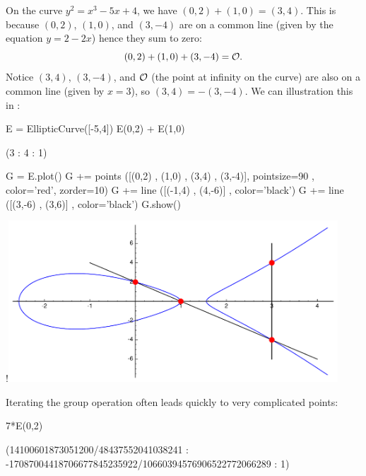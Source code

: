 \begin{example}\label{ex:ecgplaw}
On the curve $y^2=x^3-5x+4$, we have $(0,2) + (1,0) = (3,4)$.
This is because $(0,2)$, $(1,0)$, and $(3,-4)$ are on a common line
(given by the equation $y = 2 - 2x$) hence they sum to zero:
$$
  (0,2) + (1,0) + (3,-4) = \mathcal{O}.
$$
Notice $(3,4)$, $(3,-4)$, and $\mathcal{O}$ (the point at infinity on the curve) are also
on a common line (given by $x = 3$), so $(3,4)=-(3,-4)$.
We can illustration this in \sage:
\begin{sagecode}
\begin{sagecell}
E = EllipticCurve([-5,4])
E(0,2) + E(1,0)
\end{sagecell}
\begin{sageout}
(3 : 4 : 1)
\end{sageout}
\begin{sagecell} %

G = E.plot()
G += points ([(0,2) , (1,0) , (3,4) , (3,-4)],
    pointsize=90 , color='red', zorder=10)
G += line ([(-1,4) , (4,-6)] , color='black')
G += line ([(3,-6) , (3,6)] , color='black')
G.show()
\end{sagecell}
\begin{sageout}[escapechar=!] %
!\includegraphics[width=0.925\textwidth]{graphics/grouplaw}
\end{sageout}
\end{sagecode} %

\noindent
Iterating the group operation often leads quickly to
very complicated points:

\begin{sagecode} %
\begin{sagecell}
7*E(0,2)
\end{sagecell}
\begin{sageout}
(14100601873051200/48437552041038241 :
-17087004418706677845235922/10660394576906522772066289 :
 1)
\end{sageout}
\end{sagecode}
\end{example}

